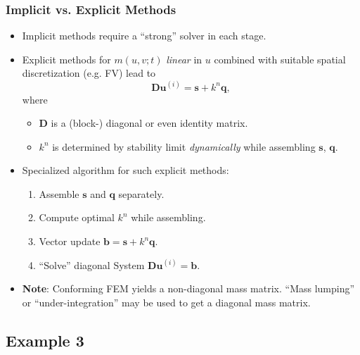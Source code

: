 \begin{frame}
\frametitle{Implicit vs. Explicit Methods}
\begin{itemize}
\item Implicit methods require a ``strong'' solver in each stage.
\item Explicit methods for $m(u,v;t)$ \textit{linear} in $u$ combined with
suitable spatial discretization (e.g. FV) lead to
\begin{equation*}
\mathbf{D} \mathbf{u}^{(i)} = \mathbf{s} + k^n \mathbf{q},
\end{equation*}
where
\begin{itemize}
\item $\mathbf{D}$ is a (block-) diagonal or even identity matrix.
\item $k^n$ is determined by stability limit \textit{dynamically} while
assembling $\mathbf{s}$, $\mathbf{q}$.
\end{itemize}
\item Specialized algorithm for such explicit methods:
\begin{enumerate}
\item Assemble $\mathbf{s}$ and $\mathbf{q}$ separately.
\item Compute optimal $k^n$ while assembling.
\item Vector update $\mathbf{b} = \mathbf{s} + k^n \mathbf{q}$.
\item ``Solve'' diagonal System $\mathbf{D} \mathbf{u}^{(i)} = \mathbf{b}$.
\end{enumerate}
\item \textbf{Note}: Conforming FEM yields a non-diagonal mass matrix. ``Mass lumping'' or
``under-integration'' may be used to get a diagonal mass matrix.
\end{itemize}
\end{frame}


\subsection{Example 3}

